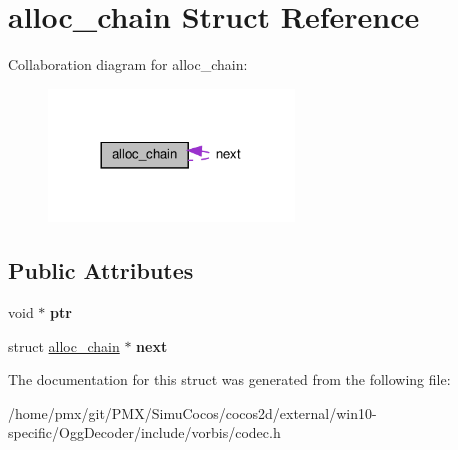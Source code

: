 \hypertarget{structalloc__chain}{}\section{alloc\+\_\+chain Struct Reference}
\label{structalloc__chain}


Collaboration diagram for alloc\+\_\+chain\+:
\nopagebreak
\begin{figure}[H]
\begin{center}
\leavevmode
\includegraphics[width=185pt]{structalloc__chain__coll__graph}
\end{center}
\end{figure}
\subsection*{Public Attributes}
\begin{DoxyCompactItemize}
\item 
\mbox{\label{structalloc__chain_a20813b86d366ae5da23555f43024426a}} 
void $\ast$ {\bfseries ptr}
\item 
\mbox{\label{structalloc__chain_a120a0b6d1dd5d84a1987868b3ba29867}} 
struct \hyperlink{structalloc__chain}{alloc\+\_\+chain} $\ast$ {\bfseries next}
\end{DoxyCompactItemize}


The documentation for this struct was generated from the following file\+:\begin{DoxyCompactItemize}
\item 
/home/pmx/git/\+P\+M\+X/\+Simu\+Cocos/cocos2d/external/win10-\/specific/\+Ogg\+Decoder/include/vorbis/codec.\+h\end{DoxyCompactItemize}
